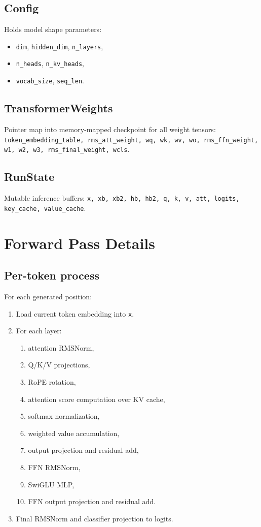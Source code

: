 \documentclass[11pt]{article}
\begin{document}
\subsection{Config}
Holds model shape parameters:
\begin{itemize}[leftmargin=*]
  \item \texttt{dim}, \texttt{hidden\_dim}, \texttt{n\_layers},
  \item \texttt{n\_heads}, \texttt{n\_kv\_heads},
  \item \texttt{vocab\_size}, \texttt{seq\_len}.
\end{itemize}

\subsection{TransformerWeights}
Pointer map into memory-mapped checkpoint for all weight tensors:
\texttt{token\_embedding\_table, rms\_att\_weight, wq, wk, wv, wo, rms\_ffn\_weight, w1, w2, w3, rms\_final\_weight, wcls}.

\subsection{RunState}
Mutable inference buffers:
\texttt{x, xb, xb2, hb, hb2, q, k, v, att, logits, key\_cache, value\_cache}.

\section{Forward Pass Details}
\subsection{Per-token process}
For each generated position:
\begin{enumerate}[leftmargin=*]
  \item Load current token embedding into \texttt{x}.
  \item For each layer:
  \begin{enumerate}
    \item attention RMSNorm,
    \item Q/K/V projections,
    \item RoPE rotation,
    \item attention score computation over KV cache,
    \item softmax normalization,
    \item weighted value accumulation,
    \item output projection and residual add,
    \item FFN RMSNorm,
    \item SwiGLU MLP,
    \item FFN output projection and residual add.
  \end{enumerate}
  \item Final RMSNorm and classifier projection to logits.
\end{enumerate}
\end{document}
